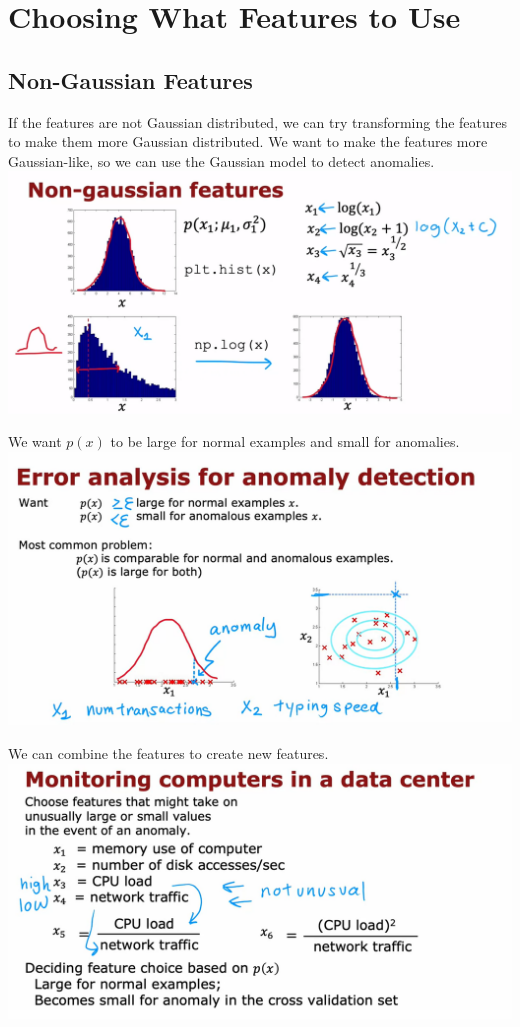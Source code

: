\section{Choosing What Features to Use}
\subsection*{Non-Gaussian Features}
If the features are not Gaussian distributed, we can 
try transforming the features to make them more Gaussian distributed.
We want to make the features more Gaussian-like, so we can use the Gaussian model to detect anomalies.\\
\includegraphics*[width=\textwidth]{images/a5}

We want $p(x)$ to be large for normal examples and small for anomalies.\\
\includegraphics*[width=\textwidth]{images/a6}

We can combine the features to create new features.\\
\includegraphics*[width=\textwidth]{images/a7}
